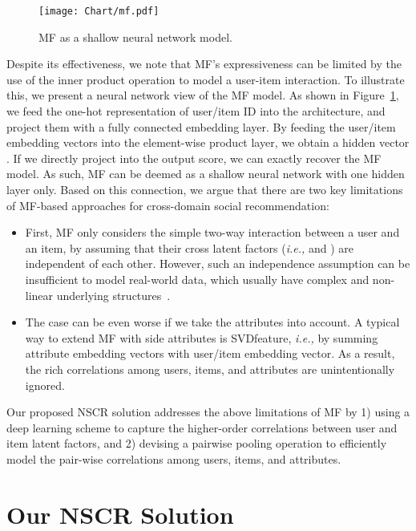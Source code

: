\documentclass[sigconf]{acmart}
\newcommand{\ie}{\emph{i.e., }}
\begin{document}
\begin{figure}
	\centering
\texttt{[image: Chart/mf.pdf]}
	\vspace{-5pt}
	\caption{MF as a shallow neural network model.}\label{fig:mf_limit}
	\vspace{-1em}
\end{figure}

Despite its effectiveness, we note that MF's expressiveness can be limited by the use of the inner product operation to model a user-item interaction. To illustrate this, we present a neural network view of the MF model. As shown in Figure~\ref{fig:mf_limit},  we feed the one-hot representation of user/item ID into the architecture, and project them with a fully connected embedding layer. By feeding the user/item embedding vectors into the element-wise product layer, we obtain a hidden vector .
If we directly project  into the output score, we can exactly recover the MF model.
As such, MF can be deemed as a shallow neural network with one hidden layer only. Based on this connection, we argue that there are two key limitations of MF-based approaches for cross-domain social recommendation:
\begin{itemize}[leftmargin=*]	
	\item First, MF only considers the simple two-way interaction between a user and an item, by assuming that their cross latent factors (\ie  and ) are independent of each other. However, such an independence assumption can be insufficient to model real-world data,
which usually have complex and non-linear underlying structures~\cite{he2017neural,SNE}.
	\item The case can be even worse if we take the attributes into account. A typical way to extend MF with side attributes is SVDfeature, \ie by summing attribute embedding vectors with user/item embedding vector. As a result, the rich correlations among users, items, and attributes are unintentionally ignored.
\end{itemize}

\noindent Our proposed NSCR solution addresses the above limitations of MF by 1) using a deep learning scheme to capture the higher-order correlations between user and item latent factors, and 2) devising a pairwise pooling operation to efficiently model the pair-wise correlations among users, items, and attributes.


\section{Our NSCR Solution}
\end{document}

